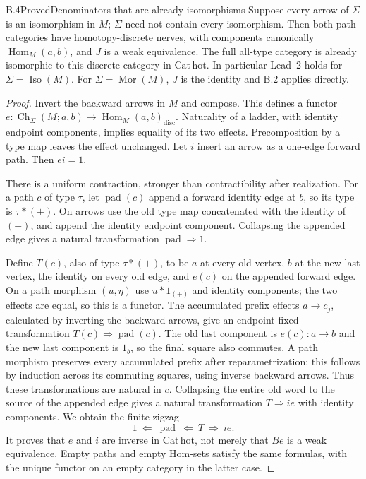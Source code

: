 \begin{result}{B.4}{Proved}{Denominators that are already isomorphisms}
Suppose every arrow of $\Sigma$ is an isomorphism in $M$; $\Sigma$ need not contain every isomorphism. Then both path categories have homotopy-discrete nerves, with components canonically $\operatorname{Hom}_M(a,b)$, and $J$ is a weak equivalence. The full all-type category is already isomorphic to this discrete category in $\mathrm{Cat}\,\mathrm{hot}$. In particular Lead~2 holds for $\Sigma=\operatorname{Iso}(M)$. For $\Sigma=\operatorname{Mor}(M)$, $J$ is the identity and B.2 applies directly.
\end{result}
\begin{proof}
Invert the backward arrows in $M$ and compose. This defines a functor
$e:\operatorname{Ch}_\Sigma(M;a,b)\to\operatorname{Hom}_M(a,b)_{\mathrm{disc}}$.
Naturality of a ladder, with identity endpoint components, implies equality of its two effects. Precomposition by a type map leaves the effect unchanged. Let $i$ insert an arrow as a one-edge forward path. Then $ei=1$.

There is a uniform contraction, stronger than contractibility after realization. For a path $c$ of type $\tau$, let $\operatorname{pad}(c)$ append a forward identity edge at $b$, so its type is $\tau*(+)$. On arrows use the old type map concatenated with the identity of $(+)$, and append the identity endpoint component. Collapsing the appended edge gives a natural transformation $\operatorname{pad}\Rightarrow1$.

Define $T(c)$, also of type $\tau*(+)$, to be $a$ at every old vertex, $b$ at the new last vertex, the identity on every old edge, and $e(c)$ on the appended forward edge. On a path morphism $(u,\eta)$ use $u*1_{(+)}$ and identity components; the two effects are equal, so this is a functor. The accumulated prefix effects $a\to c_j$, calculated by inverting the backward arrows, give an endpoint-fixed transformation $T(c)\Rightarrow\operatorname{pad}(c)$. The old last component is $e(c):a\to b$ and the new last component is $1_b$, so the final square also commutes. A path morphism preserves every accumulated prefix after reparametrization; this follows by induction across its commuting squares, using inverse backward arrows. Thus these transformations are natural in $c$. Collapsing the entire old word to the source of the appended edge gives a natural transformation $T\Rightarrow ie$ with identity components. We obtain the finite zigzag
\[
       1\ \Longleftarrow\ \operatorname{pad}
          \ \Longleftarrow\ T\ \Longrightarrow\ ie.
\]
It proves that $e$ and $i$ are inverse in $\mathrm{Cat}\,\mathrm{hot}$, not merely that $Be$ is a weak equivalence. Empty paths and empty Hom-sets satisfy the same formulas, with the unique functor on an empty category in the latter case.


\end{proof}

